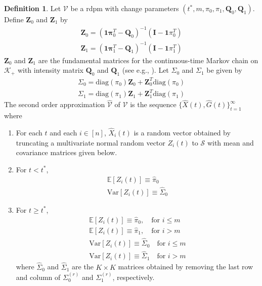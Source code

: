 \documentclass[final]{IEEEtran}
\theoremstyle{definition}
\newtheorem{definition}{Definition}
\begin{document}
\begin{definition}
  \label{def:2}
  Let $\mathscr{V}$ be a rdpm with change parameters $(t^{*}, m,
  \pi_0, \pi_1, \mathbf{Q}_0, \mathbf{Q}_1)$. Define
  $\mathbf{Z}_0$ and $\mathbf{Z}_1$ by
  \begin{gather}
    \mathbf{Z}_0 = (\mathbf{1}\mathbf{\pi}_0^{T} -
     \mathbf{Q}_0)^{-1}(\mathbf{I} - \mathbf{1}\pi_0^{T}) \\
    \mathbf{Z}_1 = (\mathbf{1}\mathbf{\pi}_1^{T} -
     \mathbf{Q}_1)^{-1}(\mathbf{I} - \mathbf{1}\pi_1^{T})
  \end{gather}
  $\mathbf{Z}_0$ and $\mathbf{Z}_1$ are the fundamental matrices
  for the continuous-time Markov chain on $\mathscr{K}_{+}$ with intensity
  matrix $\mathbf{Q}_0$ and $\mathbf{Q}_1$ (see
  e.g., \cite[p. 55]{asmussen03:_applied_probab_queues}). Let
  $\Sigma_0$ and $\Sigma_1$ be given by
  \begin{gather*}
    \Sigma_0 = \mathrm{diag}(\pi_0) \mathbf{Z}_0 +
    \mathbf{Z}_0^{T}
    \mathrm{diag}(\pi_0) \\
    \Sigma_1 = \mathrm{diag}(\pi_1) \mathbf{Z}_1 +
    \mathbf{Z}_1^{T}
    \mathrm{diag}(\pi_1)
  \end{gather*}
  The second order approximation $\widehat{\mathscr{V}}$ of
  $\mathscr{V}$ is the sequence $\{\widehat{X}(t),
  \widehat{G}(t)\}_{t=1}^{\infty}$ where
  \begin{enumerate}
  \item For each $t$ and each $i \in [n]$, $\widehat{X}_i(t)$ is a
    random vector obtained by truncating a multivariate normal random
    vector $Z_{i}(t)$ to $\mathscr{S}$ with mean and covariance
    matrices given below.
  \item For $t < t^{*}$,
    \begin{gather}
      \mathbb{E}[Z_i(t)] \equiv \hat{\pi}_0 \\
      \mathrm{Var}[Z_i(t)] \equiv \widehat{\Sigma}_0
    \end{gather}
  \item For $t \geq t^{*}$,  
    \begin{gather*}
      \mathbb{E}[Z_i(t)] \equiv \hat{\pi}_0, \quad \text{for $i \leq
        m$}  \\
      \mathbb{E}[Z_i(t)] \equiv \hat{\pi}_1, \quad \text{for $i > 
        m$}  \\
      \mathrm{Var}[Z_i(t)] \equiv \widehat{\Sigma}_{0} \quad \text{for $i
        \leq m$} \\
      \mathrm{Var}[Z_i(t)] \equiv \widehat{\Sigma}_{1} \quad \text{for $i
        > m$}
    \end{gather*}
    where $\widehat{\Sigma}_0$ and $\widehat{\Sigma}_1$ are the $K
    \times K$ matrices
    obtained by removing the last row and column of $\Sigma_0^{(r)}$ and
    $\Sigma_1^{(r)}$, respectively. 
  \end{enumerate}
\end{definition}
\end{document}
